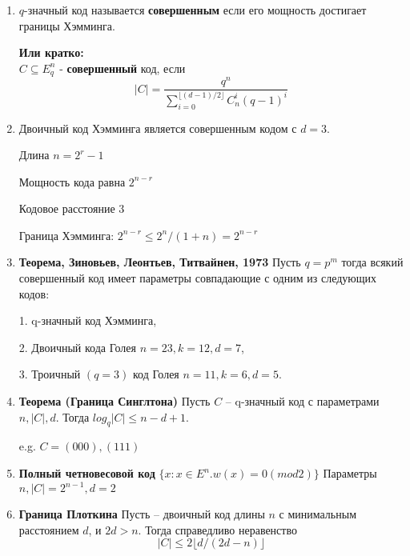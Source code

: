 \documentclass[a4paper, 12pt]{report}
\begin{document}
\begin{enumerate}
\item
$q$-значный код называется \textbf{совершенным} если его мощность
достигает границы Хэмминга.

\textbf{Или кратко:}\\
$C \subseteq E_{q}^{n}$ - \textbf{совершенный} код, если 
\[|C| = \frac {q^n} {{\sum_{i = 0}^{\lfloor(d - 1)/2\rfloor} C_n^i (q - 1)^i}} \] 

\item 
Двоичный код Хэмминга является совершенным кодом с $d = 3$.

Длина $n = 2^r - 1$

Мощность кода равна $2^{n-r}$

Кодовое расстояние $3$

Граница Хэмминга: $2^{n-r} \leq 2^n/(1 + n) = 2^{n-r}$

\newpage

\item \textbf{Теорема, Зиновьев, Леонтьев, Титвайнен, 1973}
Пусть $q = p^m$ тогда всякий совершенный код имеет параметры
совпадающие с одним из следующих кодов:

1. q-значный код Хэмминга,

2. Двоичный кода Голея $n = 23, k = 12, d = 7$,

3. Троичный $(q = 3)$ код Голея $n = 11, k = 6, d = 5$.

\item \textbf{Теорема (Граница Синглтона)}
Пусть $C$ – q-значный код с параметрами $n, |C|, d$. Тогда
$log_{q}|C| \leq n - d + 1$.

e.g. $C = {(000),(111)}$


\item \textbf{Полный четновесовой код}
$\{x : x \in E^n. w(x) = 0(mod 2)\}$
Параметры $n, |C| = 2^{n - 1}, d = 2$

\item \textbf{Граница Плоткина}
Пусть – двоичный код длины $n$ с минимальным расстоянием
$d$, и $2d > n$. Тогда справедливо неравенство
\[ |C| \leq 2 \lfloor   d/(2d - n) \rfloor \]

\end{enumerate}
\end{document}

